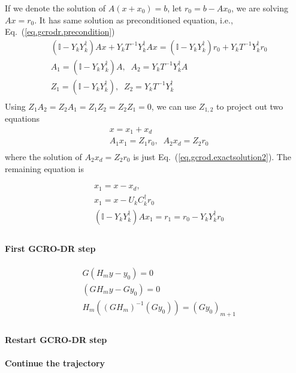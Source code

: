 If we denote the solution of $A(x+x_0)=b$, let $r_0=b-Ax_0$, we are solving $Ax=r_0$. It has same solution as preconditioned equation, i.e., Eq.~(\ref{eq.gcrodr.precondition})
\begin{equation}
\begin{split}
&\left(\mathbb{I}-Y_kY_k^{\dagger}\right)Ax+Y_kT^{-1}Y_k^{\dagger}Ax=\left(\mathbb{I}-Y_kY_k^{\dagger}\right)r_0+Y_kT^{-1}Y_k^{\dagger}r_0\\
&A_1=\left(\mathbb{I}-Y_kY_k^{\dagger}\right)A,\;\;A_2=Y_kT^{-1}Y_k^{\dagger}A\\
&Z_1=\left(\mathbb{I}-Y_kY_k^{\dagger}\right),\;\;Z_2=Y_kT^{-1}Y_k^{\dagger}\\
\end{split}
\end{equation}
Using $Z_1A_2=Z_2A_1=Z_1Z_2=Z_2Z_1=0$, we can use $Z_{1,2}$ to project out two equations
\begin{equation}
\begin{split}
&x=x_1+x_d\\
&A_1x_1=Z_1r_0,\;\;A_2x_d=Z_2r_0\\
\end{split}
\end{equation}
where the solution of $A_2x_d=Z_2r_0$ is just Eq.~(\ref{eq.gcrod.exactsolution2}). The remaining equation is

\begin{equation}
\begin{split}
&x_1=x-x_d,\\
&x_1=x-U_kC_k^{\dagger}r_0\\
&\left(\mathbb{I}-Y_kY_k^{\dagger}\right)Ax_1=r_1=r_0-Y_kY_k^{\dagger}r_0\\
\end{split}
\end{equation}

\paragraph{First GCRO-DR step}

\begin{equation}
\begin{split}
&G(H_my-y_0)=0\\
&(GH_my-Gy_0)=0\\
&H_m\left((GH_m)^{-1}(Gy_0)\right)=(Gy_0)_{m+1}\\
\end{split}
\end{equation}

\paragraph{Restart GCRO-DR step}

\paragraph{Continue the trajectory}
